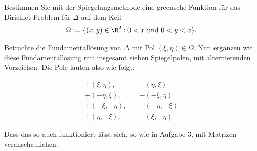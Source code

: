 
\begin{exercise}

Bestimmen Sie mit der Spiegelungsmethode eine greensche Funktion für das
Dirichlet-Problem für $\Delta$ auf dem Keil
\begin{align*}
  \Omega := \{(x,y) \in \R^2: 0 < x \text{ und } 0 < y < x\}.
\end{align*}

\end{exercise}


\begin{solution}

Betrachte die Fundamentallösung von $\Delta$ mit Pol $(\xi,\eta) \in \Omega$.
Nun ergänzen wir diese Fundamentallösung mit insgesamt sieben Spiegelpolen,
mit alternierenden Vorzeichen. Die Pole lauten also wie folgt:

\begin{align*}
  +(\xi,\eta), \quad& -(\eta,\xi) \\
  +(-\eta,\xi), \quad& -(-\xi,\eta) \\
  +(-\xi,-\eta), \quad& -(-\eta,-\xi) \\
  +(\eta,-\xi), \quad& -(\xi,-\eta)
\end{align*}

Dass das so auch funktioniert lässt sich, so wie in Aufgabe 3, mit Matrizen veranschaulichen.


\end{solution}
